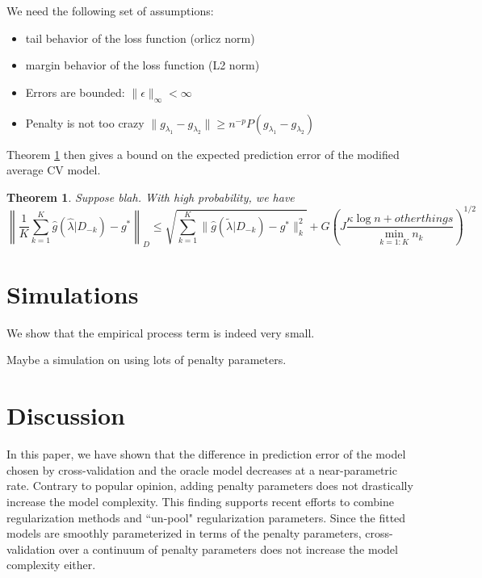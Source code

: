 \documentclass[12pt]{article}
\newtheorem{theorem}{Theorem}
\begin{document}
We need the following set of assumptions:
\begin{itemize}
\item{tail behavior of the loss function (orlicz norm)}
\item{margin behavior of the loss function (L2 norm)}
\item{Errors are bounded: $\| \epsilon \|_\infty < \infty $}
\item{Penalty is not too crazy $\| g_{\lambda_1} - g_{\lambda_2} \| \ge n^{-p} P(g_{\lambda_1} - g_{\lambda_2})$}
\end{itemize}

Theorem \ref{kfold_thrm} then gives a bound on the expected prediction error of the modified average CV model.
\begin{theorem}
\label{kfold_thrm}
Suppose blah.
With high probability, we have
\begin{equation}
\label{smooth_error_bound}
\left \| \frac{1}{K}\sum_{k=1}^K \hat{g}(\hat{\lambda} | D_{-k}) - g^* \right \|_D \le \sqrt{\sum_{k=1}^K \|\hat{g}(\tilde{\lambda} | D_{-k}) - g^*\|_k^2 } + G \left ( J \frac{\kappa \log n + otherthings}{\min_{k=1:K} n_k} \right )^{1/2}
\end{equation}
\end{theorem}

\section{Simulations}

We show that the empirical process term is indeed very small.

Maybe a simulation on using lots of penalty parameters.

\section{Discussion}

In this paper, we have shown that the difference in prediction error of the model chosen by cross-validation and the oracle model decreases at a near-parametric rate. Contrary to popular opinion, adding penalty parameters does not drastically increase the model complexity. This finding supports recent efforts to combine regularization methods and ``un-pool" regularization parameters. Since the fitted models are smoothly parameterized in terms of the penalty parameters, cross-validation over a continuum of penalty parameters does not increase the model complexity either.
\end{document}
